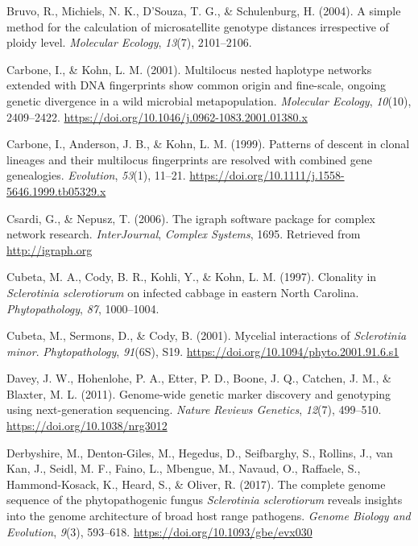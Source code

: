 \hypertarget{ref-bruvo2004simple}{}
Bruvo, R., Michiels, N. K., D'Souza, T. G., \& Schulenburg, H. (2004). A
simple method for the calculation of microsatellite genotype distances
irrespective of ploidy level. \emph{Molecular Ecology}, \emph{13}(7),
2101--2106.

\hypertarget{ref-carbone2001multilocus}{}
Carbone, I., \& Kohn, L. M. (2001). Multilocus nested haplotype networks
extended with DNA fingerprints show common origin and fine-scale,
ongoing genetic divergence in a wild microbial metapopulation.
\emph{Molecular Ecology}, \emph{10}(10), 2409--2422.
\url{https://doi.org/10.1046/j.0962-1083.2001.01380.x}

\hypertarget{ref-carbone1999patterns}{}
Carbone, I., Anderson, J. B., \& Kohn, L. M. (1999). Patterns of descent
in clonal lineages and their multilocus fingerprints are resolved with
combined gene genealogies. \emph{Evolution}, \emph{53}(1), 11--21.
\url{https://doi.org/10.1111/j.1558-5646.1999.tb05329.x}

\hypertarget{ref-csardi2006igraph}{}
Csardi, G., \& Nepusz, T. (2006). The igraph software package for
complex network research. \emph{InterJournal}, \emph{Complex Systems},
1695. Retrieved from \url{http://igraph.org}

\hypertarget{ref-cubeta1997clonality}{}
Cubeta, M. A., Cody, B. R., Kohli, Y., \& Kohn, L. M. (1997). Clonality
in \emph{Sclerotinia sclerotiorum} on infected cabbage in eastern North
Carolina. \emph{Phytopathology}, \emph{87}, 1000--1004.

\hypertarget{ref-cubeta2001mycelial}{}
Cubeta, M., Sermons, D., \& Cody, B. (2001). Mycelial interactions of
\emph{Sclerotinia minor}. \emph{Phytopathology}, \emph{91}(6S), S19.
\url{https://doi.org/10.1094/phyto.2001.91.6.s1}

\hypertarget{ref-davey2011genome}{}
Davey, J. W., Hohenlohe, P. A., Etter, P. D., Boone, J. Q., Catchen, J.
M., \& Blaxter, M. L. (2011). Genome-wide genetic marker discovery and
genotyping using next-generation sequencing. \emph{Nature Reviews
Genetics}, \emph{12}(7), 499--510. \url{https://doi.org/10.1038/nrg3012}

\hypertarget{ref-derbyshire2017complete}{}
Derbyshire, M., Denton-Giles, M., Hegedus, D., Seifbarghy, S., Rollins,
J., van Kan, J., Seidl, M. F., Faino, L., Mbengue, M., Navaud, O.,
Raffaele, S., Hammond-Kosack, K., Heard, S., \& Oliver, R. (2017). The
complete genome sequence of the phytopathogenic fungus \emph{Sclerotinia
sclerotiorum} reveals insights into the genome architecture of broad
host range pathogens. \emph{Genome Biology and Evolution}, \emph{9}(3),
593--618. \url{https://doi.org/10.1093/gbe/evx030}

